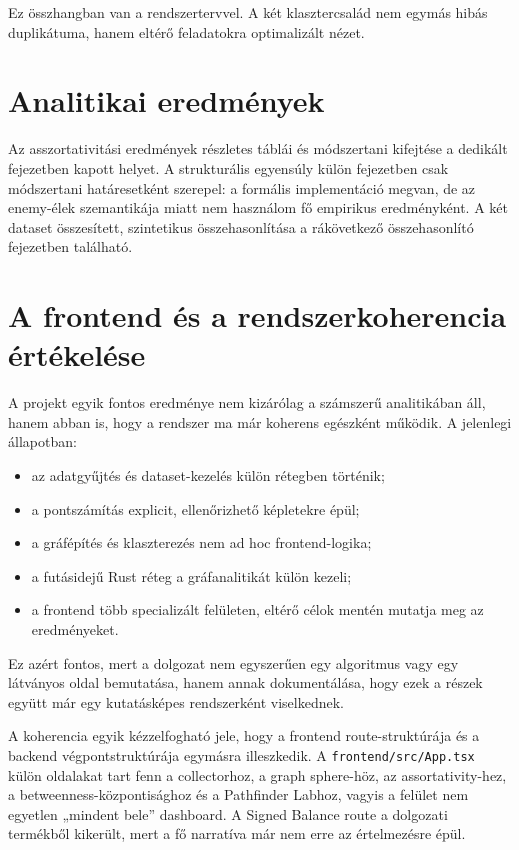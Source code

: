 ﻿\documentclass[a4paper,12pt]{report}
\begin{document}
Ez összhangban van a rendszertervvel. A két klasztercsalád nem egymás hibás duplikátuma, hanem eltérő feladatokra optimalizált nézet.

\section{Analitikai eredmények}

Az asszortativitási eredmények részletes táblái és módszertani kifejtése a dedikált fejezetben kapott helyet. A strukturális egyensúly külön fejezetben csak módszertani határesetként szerepel: a formális implementáció megvan, de az enemy-élek szemantikája miatt nem használom fő empirikus eredményként. A két dataset összesített, szintetikus összehasonlítása a rákövetkező összehasonlító fejezetben található.

\section{A frontend és a rendszerkoherencia értékelése}

A projekt egyik fontos eredménye nem kizárólag a számszerű analitikában áll, hanem abban is, hogy a rendszer ma már koherens egészként működik. A jelenlegi állapotban:

\begin{itemize}
    \item az adatgyűjtés és dataset-kezelés külön rétegben történik;
    \item a pontszámítás explicit, ellenőrizhető képletekre épül;
    \item a gráfépítés és klaszterezés nem ad hoc frontend-logika;
    \item a futásidejű Rust réteg a gráfanalitikát külön kezeli;
    \item a frontend több specializált felületen, eltérő célok mentén mutatja meg az eredményeket.
\end{itemize}

Ez azért fontos, mert a dolgozat nem egyszerűen egy algoritmus vagy egy látványos oldal bemutatása, hanem annak dokumentálása, hogy ezek a részek együtt már egy kutatásképes rendszerként viselkednek.

A koherencia egyik kézzelfogható jele, hogy a frontend route-struktúrája és a backend végpontstruktúrája egymásra illeszkedik. A \texttt{frontend/src/App.tsx} külön oldalakat tart fenn a collectorhoz, a graph sphere-höz, az assortativity-hez, a betweenness-központisághoz és a Pathfinder Labhoz, vagyis a felület nem egyetlen „mindent bele” dashboard. A Signed Balance route a dolgozati termékből kikerült, mert a fő narratíva már nem erre az értelmezésre épül.
\end{document}
